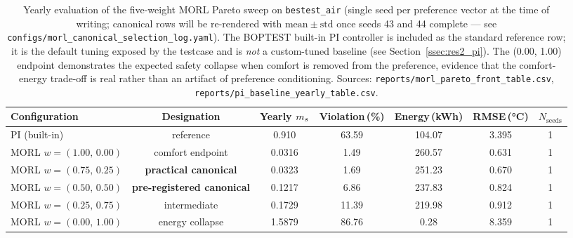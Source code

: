 \begin{table}[t]
  \centering
  \caption{Yearly evaluation of the five-weight MORL Pareto sweep on \boptest{} \texttt{bestest\_air} (single seed per preference vector at the time of writing; canonical rows will be re-rendered with $\mathrm{mean}\pm\mathrm{std}$ once seeds 43 and 44 complete --- see \texttt{configs/morl\_canonical\_selection\_log.yaml}). The BOPTEST built-in PI controller is included as the standard reference row; it is the default tuning exposed by the testcase and is \emph{not} a custom-tuned baseline (see Section~\ref{ssec:res2_pi}). The (0.00, 1.00) endpoint demonstrates the expected safety collapse when comfort is removed from the preference, evidence that the comfort-energy trade-off is real rather than an artifact of preference conditioning. Sources: \texttt{reports/morl\_pareto\_front\_table.csv}, \texttt{reports/pi\_baseline\_yearly\_table.csv}.}
  \label{tab:pareto}
  \begin{tabular}{lcccccc}
    \toprule
    Configuration & Designation & Yearly $m_s$ & Violation\,(\%) & Energy\,(kWh) & RMSE\,(\si{\celsius}) & $N_{\mathrm{seeds}}$ \\
    \midrule
    \boptest{} PI (built-in) & reference & 0.910 & 63.59 & 104.07 & 3.395 & 1 \\
    \midrule
    MORL $w=(1.00,\,0.00)$ & comfort endpoint & 0.0316 & 1.49 & 260.57 & 0.631 & 1 \\
    MORL $w=(0.75,\,0.25)$ & \textbf{practical canonical} & 0.0323 & 1.69 & 251.23 & 0.670 & 1 \\
    MORL $w=(0.50,\,0.50)$ & \textbf{pre-registered canonical} & 0.1217 & 6.86 & 237.83 & 0.824 & 1 \\
    MORL $w=(0.25,\,0.75)$ & intermediate & 0.1729 & 11.39 & 219.98 & 0.912 & 1 \\
    MORL $w=(0.00,\,1.00)$ & energy collapse & 1.5879 & 86.76 & 0.28 & 8.359 & 1 \\
    \bottomrule
  \end{tabular}
\end{table}
